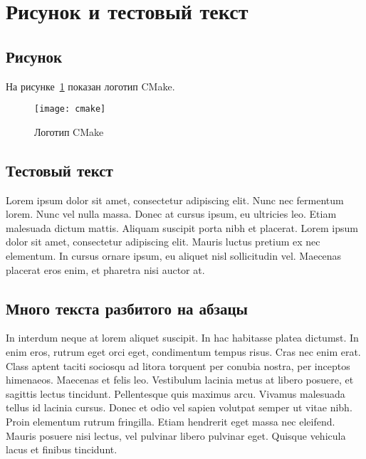 \section{Рисунок и тестовый текст}\label{sec:chapter_2/section_1}

\subsection{Рисунок}\label{subsec:chapter_2/section_1/subsection_1}

На рисунке~\cref{fig:cmake} показан логотип CMake.

\begin{figure}[ht]
    \centerfloat
    {
        \texttt{[image: cmake]}
    }
    \caption{Логотип CMake}\label{fig:cmake}
\end{figure}

\subsection{Тестовый текст}\label{subsec:chapter_2/section_1/subsection_2}

Lorem ipsum dolor sit amet, consectetur adipiscing elit. Nunc nec fermentum lorem. Nunc vel nulla massa. Donec at cursus ipsum, eu ultricies leo. Etiam malesuada dictum mattis. Aliquam suscipit porta nibh et placerat. Lorem ipsum dolor sit amet, consectetur adipiscing elit. Mauris luctus pretium ex nec elementum. In cursus ornare ipsum, eu aliquet nisl sollicitudin vel. Maecenas placerat eros enim, et pharetra nisi auctor at.

\subsection{Много текста разбитого на абзацы}\label{subsec:chapter_2/section_1/subsection_3}

In interdum neque at lorem aliquet suscipit. In hac habitasse platea dictumst. In enim eros, rutrum eget orci eget, condimentum tempus risus. Cras nec enim erat. Class aptent taciti sociosqu ad litora torquent per conubia nostra, per inceptos himenaeos. Maecenas et felis leo. Vestibulum lacinia metus at libero posuere, et sagittis lectus tincidunt. Pellentesque quis maximus arcu. Vivamus malesuada tellus id lacinia cursus. Donec et odio vel sapien volutpat semper ut vitae nibh. Proin elementum rutrum fringilla. Etiam hendrerit eget massa nec eleifend. Mauris posuere nisi lectus, vel pulvinar libero pulvinar eget. Quisque vehicula lacus et finibus tincidunt.

